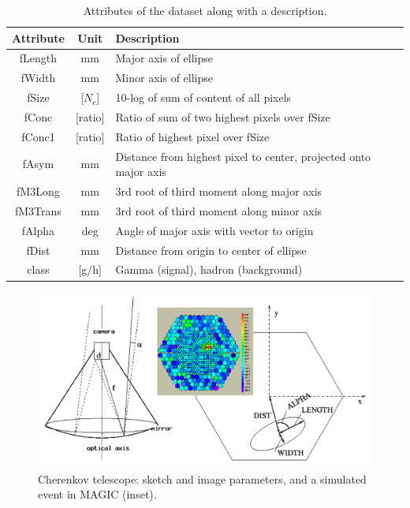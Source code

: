 \documentclass[a4paper, 12pt]{report}
\theoremstyle{definition}
\begin{document}
\begin{center}
    \begin{table}[p!]
        \renewcommand{\arraystretch}{1.5}
        \begin{tabular}{| c | c | p{9cm} |}
        \hline
        \textbf{Attribute} & \textbf{Unit} & \textbf{Description} \\
        \hline
            fLength & mm & Major axis of ellipse \\
            fWidth & mm & Minor axis of ellipse \\
            fSize & [$N_c$] & 10-log of sum of content of all pixels \\
            fConc & [ratio] & Ratio of sum of two highest pixels over fSize \\
            fConc1 & [ratio] & Ratio of highest pixel over fSize\\
            fAsym & mm & Distance from highest pixel to center, projected onto major axis \\
            fM3Long & mm & 3rd root of third moment along major axis \\
            fM3Trans & mm & 3rd root of third moment along minor axis \\
            fAlpha & deg & Angle of major axis with vector to origin \\
            fDist & mm & Distance from origin to center of ellipse \\
            class & [g/h] & Gamma (signal), hadron (background) \\
        \hline
        \end{tabular}
        \caption{\label{tab:dataset} Attributes of the dataset along with a description.}
    \end{table}
\end{center}

\begin{figure}[t!]
  \centering
  \includegraphics[scale=0.27]{im/telescope.PNG}
  \caption{Cherenkov telescope: sketch and image parameters, and a simulated event in MAGIC (inset).}
  \label{fig:telescope}
\end{figure}
\end{document}
